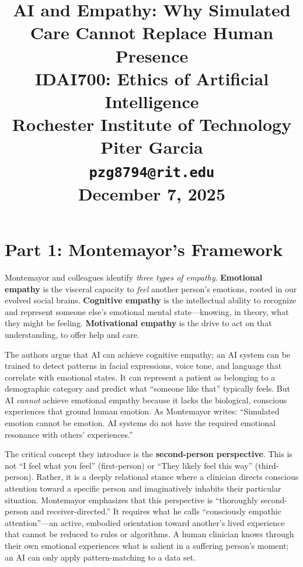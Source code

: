 \documentclass[12pt,twoside]{article}
\title{
\vspace*{1.3in}
\textbf{\Huge AI and Empathy: Why Simulated Care Cannot Replace Human Presence}\\[1.5em]
\Large IDAI700: Ethics of Artificial Intelligence\\
Rochester Institute of Technology\\[0.5em]
\textbf{Piter Garcia}\\
\texttt{pzg8794@rit.edu}\\[1em]
\textbf{December 7, 2025}
}
\author{}
\date{}
\begin{document}
\thispagestyle{empty}
\maketitle
\newpage

\pagestyle{fancy}

\section*{Part 1: Montemayor's Framework}

Montemayor and colleagues identify \textit{three types of empathy}. \textbf{Emotional empathy} is the visceral capacity to \textit{feel} another person's emotions, rooted in our evolved social brains. \textbf{Cognitive empathy} is the intellectual ability to recognize and represent someone else's emotional mental state---knowing, in theory, what they might be feeling. \textbf{Motivational empathy} is the drive to act on that understanding, to offer help and care.

The authors argue that AI can achieve cognitive empathy; an AI system can be trained to detect patterns in facial expressions, voice tone, and language that correlate with emotional states. It can represent a patient as belonging to a demographic category and predict what ``someone like that'' typically feels. But AI \textit{cannot} achieve emotional empathy because it lacks the biological, conscious experiences that ground human emotion. As Montemayor writes: ``Simulated emotion cannot be emotion. AI systems do not have the required emotional resonance with others' experiences.''

The critical concept they introduce is the \textbf{second-person perspective}. This is not ``I feel what you feel'' (first-person) or ``They likely feel this way'' (third-person). Rather, it is a deeply relational stance where a clinician directs conscious attention toward a specific person and imaginatively inhabits their particular situation. Montemayor emphasizes that this perspective is ``thoroughly second-person and receiver-directed.'' It requires what he calls ``consciously empathic attention''---an active, embodied orientation toward another's lived experience that cannot be reduced to rules or algorithms. A human clinician knows through their own emotional experiences what is salient in a suffering person's moment; an AI can only apply pattern-matching to a data set.

\end{document}
